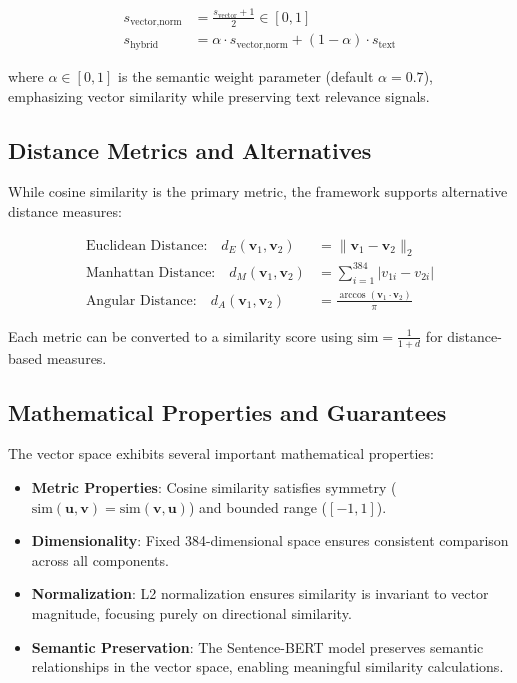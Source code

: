 \documentclass[rnd]{mas_proposal}
\begin{document}
\begin{align}
s_{\text{vector,norm}} &= \frac{s_{\text{vector}} + 1}{2} \in [0, 1] \label{eq:vector_normalization}\\
s_{\text{hybrid}} &= \alpha \cdot s_{\text{vector,norm}} + (1 - \alpha) \cdot s_{\text{text}} \label{eq:hybrid_score}
\end{align}

where $\alpha \in [0, 1]$ is the semantic weight parameter (default $\alpha = 0.7$), emphasizing vector similarity while preserving text relevance signals.

\subsection{Distance Metrics and Alternatives}

While cosine similarity is the primary metric, the framework supports alternative distance measures:

\begin{align}
\text{Euclidean Distance:} \quad d_E(\mathbf{v}_1, \mathbf{v}_2) &= \|\mathbf{v}_1 - \mathbf{v}_2\|_2 \label{eq:euclidean}\\
\text{Manhattan Distance:} \quad d_M(\mathbf{v}_1, \mathbf{v}_2) &= \sum_{i=1}^{384} |v_{1i} - v_{2i}| \label{eq:manhattan}\\
\text{Angular Distance:} \quad d_A(\mathbf{v}_1, \mathbf{v}_2) &= \frac{\arccos(\mathbf{v}_1 \cdot \mathbf{v}_2)}{\pi} \label{eq:angular}
\end{align}

Each metric can be converted to a similarity score using $\text{sim} = \frac{1}{1 + d}$ for distance-based measures.

\subsection{Mathematical Properties and Guarantees}

The vector space exhibits several important mathematical properties:

\begin{itemize}
\item \textbf{Metric Properties}: Cosine similarity satisfies symmetry ($\text{sim}(\mathbf{u}, \mathbf{v}) = \text{sim}(\mathbf{v}, \mathbf{u})$) and bounded range ($[-1, 1]$).
\item \textbf{Dimensionality}: Fixed 384-dimensional space ensures consistent comparison across all components.
\item \textbf{Normalization}: L2 normalization ensures similarity is invariant to vector magnitude, focusing purely on directional similarity.
\item \textbf{Semantic Preservation}: The Sentence-BERT model preserves semantic relationships in the vector space, enabling meaningful similarity calculations.
\end{itemize}
\end{document}
